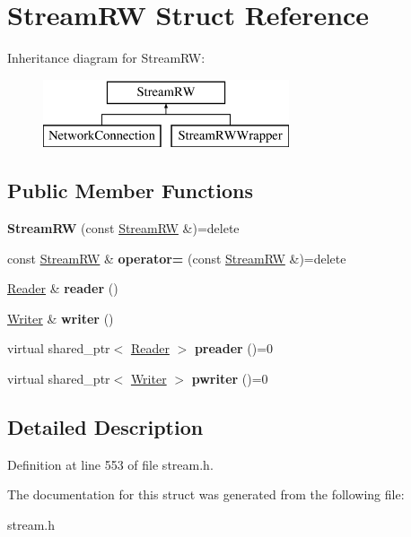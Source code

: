 \hypertarget{structStreamRW}{\section{Stream\+R\+W Struct Reference}
\label{structStreamRW}
}
Inheritance diagram for Stream\+R\+W\+:\begin{figure}[H]
\begin{center}
\leavevmode
\includegraphics[height=2.000000cm]{structStreamRW}
\end{center}
\end{figure}
\subsection*{Public Member Functions}
\begin{DoxyCompactItemize}
\item 
\hypertarget{structStreamRW_a6749cd481a77965c3c274cc30a0b50a2}{{\bfseries Stream\+R\+W} (const \hyperlink{structStreamRW}{Stream\+R\+W} \&)=delete}\label{structStreamRW_a6749cd481a77965c3c274cc30a0b50a2}

\item 
\hypertarget{structStreamRW_abbeeea35caac91c6be2566c673b9f6e3}{const \hyperlink{structStreamRW}{Stream\+R\+W} \& {\bfseries operator=} (const \hyperlink{structStreamRW}{Stream\+R\+W} \&)=delete}\label{structStreamRW_abbeeea35caac91c6be2566c673b9f6e3}

\item 
\hypertarget{structStreamRW_acca3c2b74ae7d1b49f4bb8840cdf4ad9}{\hyperlink{classReader}{Reader} \& {\bfseries reader} ()}\label{structStreamRW_acca3c2b74ae7d1b49f4bb8840cdf4ad9}

\item 
\hypertarget{structStreamRW_a28e0921583705b5d987f85d455c5ee19}{\hyperlink{classWriter}{Writer} \& {\bfseries writer} ()}\label{structStreamRW_a28e0921583705b5d987f85d455c5ee19}

\item 
\hypertarget{structStreamRW_a8010e49c279599b60a22aab25a0cd151}{virtual shared\+\_\+ptr$<$ \hyperlink{classReader}{Reader} $>$ {\bfseries preader} ()=0}\label{structStreamRW_a8010e49c279599b60a22aab25a0cd151}

\item 
\hypertarget{structStreamRW_ab2dd8e8b7944a7cff51575cc6fdcc1f2}{virtual shared\+\_\+ptr$<$ \hyperlink{classWriter}{Writer} $>$ {\bfseries pwriter} ()=0}\label{structStreamRW_ab2dd8e8b7944a7cff51575cc6fdcc1f2}

\end{DoxyCompactItemize}


\subsection{Detailed Description}


Definition at line 553 of file stream.\+h.



The documentation for this struct was generated from the following file\+:\begin{DoxyCompactItemize}
\item 
stream.\+h\end{DoxyCompactItemize}
